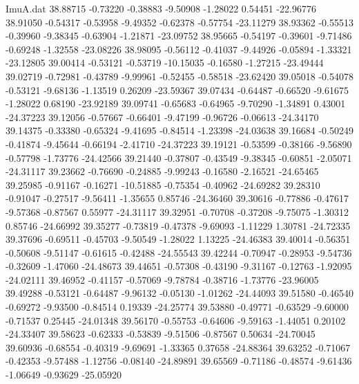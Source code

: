 \begin{filecontents}{ImuA.dat}
  38.88715   -0.73220   -0.38883   -9.50908   -1.28022    0.54451  -22.96776
  38.91050   -0.54317   -0.53958   -9.49352   -0.62378   -0.57754  -23.11279
  38.93362   -0.55513   -0.39960   -9.38345   -0.63904   -1.21871  -23.09752
  38.95665   -0.54197   -0.39601   -9.71486   -0.69248   -1.32558  -23.08226
  38.98095   -0.56112   -0.41037   -9.44926   -0.05894   -1.33321  -23.12805
  39.00414   -0.53121   -0.53719  -10.15035   -0.16580   -1.27215  -23.49444
  39.02719   -0.72981   -0.43789   -9.99961   -0.52455   -0.58518  -23.62420
  39.05018   -0.54078   -0.53121   -9.68136   -1.13519    0.26209  -23.59367
  39.07434   -0.64487   -0.66520   -9.61675   -1.28022    0.68190  -23.92189
  39.09741   -0.65683   -0.64965   -9.70290   -1.34891    0.43001  -24.37223
  39.12056   -0.57667   -0.66401   -9.47199   -0.96726   -0.06613  -24.34170
  39.14375   -0.33380   -0.65324   -9.41695   -0.84514   -1.23398  -24.03638
  39.16684   -0.50249   -0.41874   -9.45644   -0.66194   -2.41710  -24.37223
  39.19121   -0.53599   -0.38166   -9.56890   -0.57798   -1.73776  -24.42566
  39.21440   -0.37807   -0.43549   -9.38345   -0.60851   -2.05071  -24.31117
  39.23662   -0.76690   -0.24885   -9.99243   -0.16580   -2.16521  -24.65465
  39.25985   -0.91167   -0.16271  -10.51885   -0.75354   -0.40962  -24.69282
  39.28310   -0.91047   -0.27517   -9.56411   -1.35655    0.85746  -24.36460
  39.30616   -0.77886   -0.47617   -9.57368   -0.87567    0.55977  -24.31117
  39.32951   -0.70708   -0.37208   -9.75075   -1.30312    0.85746  -24.66992
  39.35277   -0.73819   -0.47378   -9.69093   -1.11229    1.30781  -24.72335
  39.37696   -0.69511   -0.45703   -9.50549   -1.28022    1.13225  -24.46383
  39.40014   -0.56351   -0.50608   -9.51147   -0.61615   -0.42488  -24.55543
  39.42244   -0.70947   -0.28953   -9.54736   -0.32609   -1.47060  -24.48673
  39.44651   -0.57308   -0.43190   -9.31167   -0.12763   -1.92095  -24.02111
  39.46952   -0.41157   -0.57069   -9.78784   -0.38716   -1.73776  -23.96005
  39.49288   -0.53121   -0.64487   -9.96132   -0.05130   -1.01262  -24.44093
  39.51580   -0.46540   -0.69272   -9.93500   -0.84514    0.19339  -24.25774
  39.53880   -0.49771   -0.63529   -9.60000   -0.71537    0.25445  -24.01348
  39.56170   -0.55753   -0.64606   -9.59163   -1.44051    0.20102  -24.33407
  39.58623   -0.62333   -0.53839   -9.51506   -0.87567    0.50634  -24.70045
  39.60936   -0.68554   -0.40319   -9.69691   -1.33365    0.37658  -24.88364
  39.63252   -0.71067   -0.42353   -9.57488   -1.12756   -0.08140  -24.89891
  39.65569   -0.71186   -0.48574   -9.61436   -1.06649   -0.93629  -25.05920

\end{filecontents}
